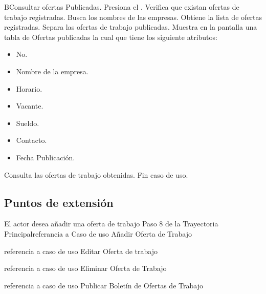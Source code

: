 \begin{UCtrayectoriaB}{B}{Consultar ofertas Publicadas.}
	\UCpaso[\UCactor] Presiona el .
	\UCpaso Verifica que existan ofertas  de trabajo registradas.
	\UCpaso Busca los nombres de las empresas. 
	\UCpaso Obtiene la lista de ofertas registradas.
	\UCpaso Separa las ofertas  de trabajo publicadas.	
	\UCpaso Muestra en la pantalla   una tabla de Ofertas publicadas la cual que tiene los siguiente atributos:
	\begin{itemize}
	\item No.
	\item Nombre de la empresa.
	\item Horario.
	\item Vacante.
	\item Sueldo.
	\item Contacto.
	\item Fecha Publicación.
	\end{itemize}
	\UCpaso[\UCactor] Consulta las ofertas de trabajo obtenidas.
	\UCpaso Fin caso de uso.
\end{UCtrayectoriaB}



\subsection{Puntos de extensión}

 {El actor desea añadir una oferta de trabajo} {Paso 8 de la Trayectoria Principal}{referancia a Caso de uso Añadir Oferta de Trabajo}


 {referencia a caso de uso Editar Oferta de trabajo}

 {referencia a caso de uso Eliminar Oferta de Trabajo}

 {referencia a caso de uso Publicar Boletín de Ofertas de Trabajo}
